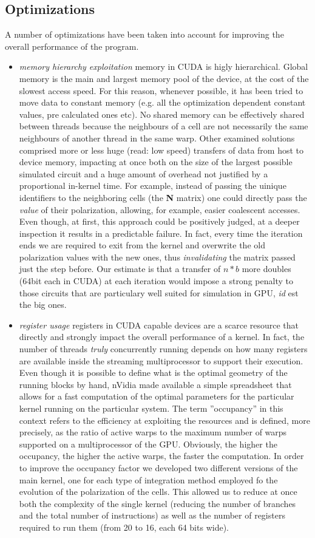 \subsection{Optimizations}
A number of optimizations have been taken into account for improving the overall performance of the program.
\begin{itemize}
\item \textsl{memory hierarchy exploitation} memory in CUDA is higly hierarchical. Global memory is the main and largest memory pool of the device, at the cost of the slowest access speed. For this reason, whenever possible, it has been tried to move data to constant memory (e.g. all the optimization dependent constant values, pre calculated ones etc). No shared memory can be effectively shared between threads because the neighbours of a cell are not necessarily the same neighbours of another thread in the same warp. Other examined solutions comprised more or less huge (read: low speed) transfers of data from host to device memory, impacting at once both on the size of the largest possible simulated circuit and a huge amount of overhead not justified by a proportional in-kernel time. For example, instead of passing the uinique identifiers to the neighboring cells (the \textbf{N} matrix) one could directly pass the \textsl{value} of their polarization, allowing, for example, easier coalescent accesses. Even though, at first, this approach could be positively judged, at a deeper inspection it results in a predictable failure. In fact, every time the iteration ends we are required to exit from the kernel and overwrite the old polarization values with the new ones, thus \textsl{invalidating} the matrix passed just the step before. Our estimate is that a transfer of $n*b$ more doubles (64bit each in CUDA) at each iteration would impose a strong penalty to those circuits that are particulary well suited for simulation in GPU, \textsl{id} est the big ones.
\item \textsl{register usage} registers in CUDA capable devices are a scarce resource that directly and strongly impact the overall performance of a kernel. In fact, the number of threads \textsl{truly} concurrently running depends on how many registers are available inside the streaming multiprocessor to support their execution. Even though it is possible to define what is the optimal geometry of the running blocks by hand, nVidia made available a simple spreadsheet that allows for a fast computation of the optimal parameters for the particular kernel running on the particular system. The term ''occupancy'' in this context refers to the efficiency at exploiting the resources and is defined, more precisely, as the ratio of active warps to the maximum number of warps supported on a multiprocessor of the GPU. Obviously, the higher the occupancy, the higher the active warps, the faster the computation. In order to improve the occupancy factor we developed two different versions of the main kernel, one for each type of integration method employed fo the evolution of the polarization of the cells. This allowed us to reduce at once both the complexity of the single kernel (reducing the number of branches and the total number of instructions) as well as the number of registers required to run them (from 20 to 16, each 64 bits wide).

\end{itemize}
